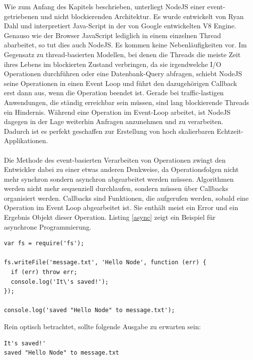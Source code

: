 Wie zum Anfang des Kapitels beschrieben, unterliegt NodeJS einer event-getriebenen und nicht blockierenden Architektur. Es wurde entwickelt von Ryan Dahl und interpretiert Java-Script in der von Google entwickelten V8 Engine. Genauso wie der Browser JavaScript lediglich in einem einzelnen Thread abarbeitet, so tut dies auch NodeJS. Es kommen keine Nebenläufigkeiten vor. Im Gegensatz zu thread-basierten Modellen, bei denen die Threads die meiste Zeit ihres Lebens im blockierten Zustand verbringen, da sie irgendwelche I/O Operationen durchführen oder eine Datenbank-Query abfragen, schiebt NodeJS seine Operationen in einen Event Loop und führt den dazugehörigen Callback erst dann aus, wenn die Operation beendet ist. Gerade bei traffic-lastigen Anwendungen, die ständig erreichbar sein müssen, sind lang blockierende Threads ein Hindernis. Während eine Operation im Event-Loop arbeitet, ist NodeJS dagegen in der Lage weiterhin Anfragen anzunehmen und zu verarbeiten. Dadurch ist es perfekt geschaffen zur Erstellung von hoch skalierbaren Echtzeit-Applikationen.\\
\\
Die Methode des event-basierten Verarbeiten von Operationen zwingt den Entwickler dabei zu einer etwas anderen Denkweise, da Operationsfolgen nicht mehr synchron sondern asynchron abgearbeitet werden müssen. Algorithmen werden nicht mehr sequenziell durchlaufen, sondern müssen über Callbacks organisiert werden. Callbacks sind Funktionen, die aufgerufen werden, sobald eine Operation im Event Loop abgearbeitet ist. Sie enthält meist ein Error und ein Ergebnis Objekt dieser Operation. Listing \ref{async} zeigt ein Beispiel für asynchrone Programmierung.

\vspace{0.6cm}
\begin{lstlisting}[caption=Speichern eines Strings in eine Datei in NodeJS,label=async]
var fs = require('fs');

fs.writeFile('message.txt', 'Hello Node', function (err) {
  if (err) throw err;
  console.log('It\'s saved!');
});

console.log('saved "Hello Node" to message.txt');
\end{lstlisting}

Rein optisch betrachtet, sollte folgende Ausgabe zu erwarten sein:

\begin{verbatim}
It's saved!'
saved "Hello Node" to message.txt
\end{verbatim}

